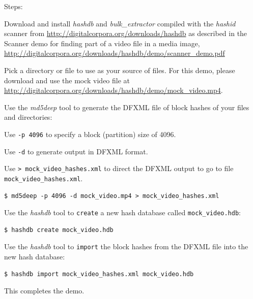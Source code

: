 \documentclass[12pt,twoside]{article}
\newcommand{\hdb}{\emph{hashdb}\xspace}
\newcommand{\bulk}{\emph{bulk\_extractor}\xspace}
\newcommand{\hashid}{\emph{hashid}\xspace}
\newcommand{\mdd}{\emph{md5deep}\xspace}
\begin{document}
Steps:
\begin{compactenum}
\item Download and install \hdb  and \bulk compiled with the \hashid scanner
from
\url{http://digitalcorpora.org/downloads/hashdb}
as described in the Scanner demo
for finding part of a video file in a media image,
\url{http://digitalcorpora.org/downloads/hashdb/demo/scanner\_demo.pdf}
\item Pick a directory or file to use
as your source of files.
For this demo, please download and use the mock video file at
\url{http://digitalcorpora.org/downloads/hashdb/demo/mock\_video.mp4}.

\item Use the \mdd tool to generate the DFXML file of block hashes
of your files and directories:
\begin{compactitem}
\item Use \texttt{-p 4096} to specify a block (partition) size of 4096.
\item Use \texttt{-d} to generate output in DFXML format.
\item Use \texttt{> mock\_video\_hashes.xml} to direct the DFXML output
to go to file \\
\texttt{mock\_video\_hashes.xml}.
\end{compactitem}
\begin{verbatim}
$ md5deep -p 4096 -d mock_video.mp4 > mock_video_hashes.xml
\end{verbatim}

\item Use the \hdb tool to \texttt{create} a new hash database
called \texttt{mock\_video.hdb}:
\begin{verbatim}
$ hashdb create mock_video.hdb
\end{verbatim}

\item Use the \hdb tool to \texttt{import} the block hashes
from the DFXML file into the new hash database:
\begin{verbatim}
$ hashdb import mock_video_hashes.xml mock_video.hdb
\end{verbatim}
\end{compactenum}

This completes the demo.
\end{document}
